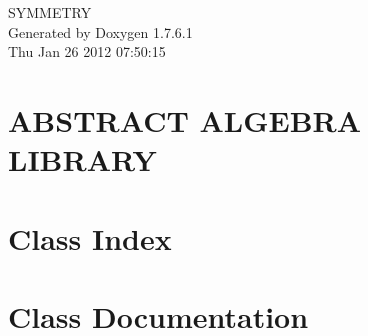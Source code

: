\documentclass[a4paper]{book}
\begin{document}
\hypersetup{pageanchor=false,citecolor=blue}
\begin{titlepage}
\vspace*{7cm}
\begin{center}
{\Large \-S\-Y\-M\-M\-E\-T\-R\-Y }\\
\vspace*{1cm}
{\large \-Generated by Doxygen 1.7.6.1}\\
\vspace*{0.5cm}
{\small Thu Jan 26 2012 07:50:15}\\
\end{center}
\end{titlepage}
\clearemptydoublepage
{}
\tableofcontents
\clearemptydoublepage
{}
\hypersetup{pageanchor=true,citecolor=blue}
\chapter{\-A\-B\-S\-T\-R\-A\-C\-T \-A\-L\-G\-E\-B\-R\-A \-L\-I\-B\-R\-A\-R\-Y}
\label{index}\hypertarget{index}{}
\chapter{\-Class \-Index}

\chapter{\-Class \-Documentation}



















\printindex
\end{document}
